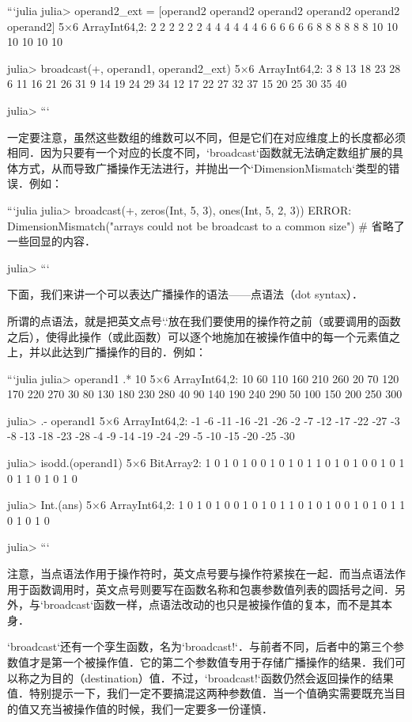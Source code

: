 ```julia
julia> operand2_ext = [operand2 operand2 operand2 operand2 operand2 operand2]
5×6 Array{Int64,2}:
  2   2   2   2   2   2
  4   4   4   4   4   4
  6   6   6   6   6   6
  8   8   8   8   8   8
 10  10  10  10  10  10

julia> broadcast(+, operand1, operand2_ext)
5×6 Array{Int64,2}:
  3   8  13  18  23  28
  6  11  16  21  26  31
  9  14  19  24  29  34
 12  17  22  27  32  37
 15  20  25  30  35  40

julia> 
```

一定要注意，虽然这些数组的维数可以不同，但是它们在对应维度上的长度都必须相同．因为只要有一个对应的长度不同，`broadcast`函数就无法确定数组扩展的具体方式，从而导致广播操作无法进行，并抛出一个`DimensionMismatch`类型的错误．例如：

```julia
julia> broadcast(+, zeros(Int, 5, 3), ones(Int, 5, 2, 3))
ERROR: DimensionMismatch("arrays could not be broadcast to a common size")
# 省略了一些回显的内容．

julia> 
```

下面，我们来讲一个可以表达广播操作的语法——点语法（dot syntax）．

所谓的点语法，就是把英文点号`.`放在我们要使用的操作符之前（或要调用的函数之后），使得此操作（或此函数）可以逐个地施加在被操作值中的每一个元素值之上，并以此达到广播操作的目的．例如：

```julia
julia> operand1 .* 10
5×6 Array{Int64,2}:
 10   60  110  160  210  260
 20   70  120  170  220  270
 30   80  130  180  230  280
 40   90  140  190  240  290
 50  100  150  200  250  300

julia> .- operand1
5×6 Array{Int64,2}:
 -1   -6  -11  -16  -21  -26
 -2   -7  -12  -17  -22  -27
 -3   -8  -13  -18  -23  -28
 -4   -9  -14  -19  -24  -29
 -5  -10  -15  -20  -25  -30

julia> isodd.(operand1)
5×6 BitArray{2}:
 1  0  1  0  1  0
 0  1  0  1  0  1
 1  0  1  0  1  0
 0  1  0  1  0  1
 1  0  1  0  1  0

julia> Int.(ans)
5×6 Array{Int64,2}:
 1  0  1  0  1  0
 0  1  0  1  0  1
 1  0  1  0  1  0
 0  1  0  1  0  1
 1  0  1  0  1  0

julia> 
```

注意，当点语法作用于操作符时，英文点号要与操作符紧挨在一起．而当点语法作用于函数调用时，英文点号则要写在函数名称和包裹参数值列表的圆括号之间．另外，与`broadcast`函数一样，点语法改动的也只是被操作值的复本，而不是其本身．

`broadcast`还有一个孪生函数，名为`broadcast!`．与前者不同，后者中的第三个参数值才是第一个被操作值．它的第二个参数值专用于存储广播操作的结果．我们可以称之为目的（destination）值．不过，`broadcast!`函数仍然会返回操作的结果值．特别提示一下，我们一定不要搞混这两种参数值．当一个值确实需要既充当目的值又充当被操作值的时候，我们一定要多一份谨慎．

